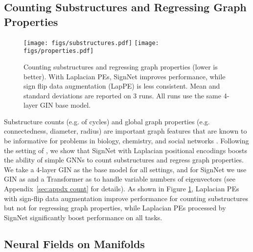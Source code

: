 \documentclass{article} \usepackage{iclr2023_conference,times}
\begin{document}
\subsection{Counting Substructures and Regressing Graph Properties}\label{sec:count_substruct}


\begin{figure}[ht]
    \centering
    \texttt{[image: figs/substructures.pdf]} \hspace{10pt}
     \texttt{[image: figs/properties.pdf]}
    \caption{Counting substructures and regressing graph properties (lower is better). With Laplacian PEs, SignNet improves performance, while sign flip data augmentation (LapPE) is less consistent. 
    Mean and standard deviations are reported on 3 runs. All runs use the same 4-layer GIN base model. 
    }
    \label{fig:counting_sub}
    \vspace{-5pt}
\end{figure}



Substructure counts (e.g. of cycles) and global graph properties (e.g. connectedness, diameter, radius) are important graph features that are known to be informative for problems in biology, chemistry, and social networks \citep{chen2020can,holland1977method}. Following the setting of \citet{zhao2022from}, we show that SignNet with Laplacian positional encodings boosts the ability of simple GNNs to count substructures and regress graph properties. We take a 4-layer GIN as the base model for all settings, and for SignNet we use GIN as  and a Transformer as  to handle variable numbers of eigenvectors (see Appendix~\ref{sec:appdx count} for details). As shown in Figure \ref{fig:counting_sub}, Laplacian PEs with sign-flip data augmentation improve performance for counting substructures but not for regressing graph properties, while Laplacian PEs processed by SignNet significantly boost performance on all tasks. 

\subsection{Neural Fields on Manifolds}
\end{document}
